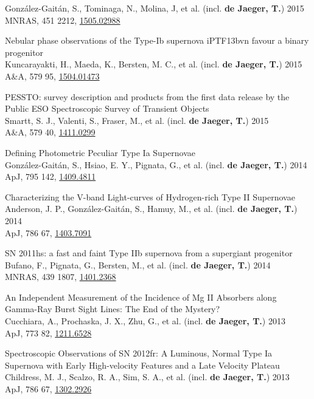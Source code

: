 \documentclass[12pt]{article}
\begin{document}
\begin{bibenum}
Gonz\'alez-Gait\'an, S., Tominaga, N., Molina, J, et al. (incl. \textbf{de Jaeger, T.}) 2015\\
MNRAS, 451 2212, \href{http://arxiv.org/abs/1505.02988}{1505.02988} 
    \item 
Nebular phase observations of the Type-Ib supernova iPTF13bvn favour a binary progenitor\\
Kuncarayakti, H., Maeda, K., Bersten, M. C., et al. (incl. \textbf{de Jaeger, T.}) 2015\\
A\&A, 579 95, \href{http://arxiv.org/abs/1504.01473}{1504.01473}
    \item 
PESSTO: survey description and products from the first data release by the Public ESO Spectroscopic Survey of Transient Objects\\
Smartt, S. J., Valenti, S., Fraser, M., et al. (incl. \textbf{de Jaeger, T.}) 2015\\
A\&A, 579 40, \href{http://arxiv.org/abs/1411.0299}{1411.0299}
    \item 
Defining Photometric Peculiar Type Ia Supernovae\\
Gonz\'alez-Gait\'an, S., Hsiao, E. Y., Pignata, G., et al. (incl. \textbf{de Jaeger, T.}) 2014\\
ApJ, 795 142, \href{http://arxiv.org/abs/1409.4811}{1409.4811}
    \item 
Characterizing the V-band Light-curves of Hydrogen-rich Type II Supernovae\\
Anderson, J. P., Gonz\'alez-Gait\'an, S., Hamuy, M., et al. (incl. \textbf{de Jaeger, T.}) 2014\\
ApJ, 786 67, \href{http://arxiv.org/abs/1403.7091}{1403.7091} 
    \item 
SN 2011hs: a fast and faint Type IIb supernova from a supergiant progenitor\\
Bufano, F., Pignata, G., Bersten, M., et al. (incl. \textbf{de Jaeger, T.}) 2014\\
MNRAS, 439 1807, \href{http://arxiv.org/abs/1401.2368}{1401.2368}
    \item 
An Independent Measurement of the Incidence of Mg II Absorbers along Gamma-Ray Burst Sight Lines: The End of the Mystery?\\
Cucchiara, A., Prochaska, J. X., Zhu, G., et al. (incl. \textbf{de Jaeger, T.}) 2013\\
ApJ, 773 82, \href{http://arxiv.org/abs/1211.6528}{1211.6528} 
    \item 
Spectroscopic Observations of SN 2012fr: A Luminous, Normal Type Ia Supernova with Early High-velocity Features and a Late Velocity Plateau\\
Childress, M. J., Scalzo, R. A., Sim, S. A., et al. (incl. \textbf{de Jaeger, T.}) 2013\\
ApJ, 786 67, \href{http://arxiv.org/abs/1302.2926}{1302.2926\\} 

\end{bibenum}
\end{document}

